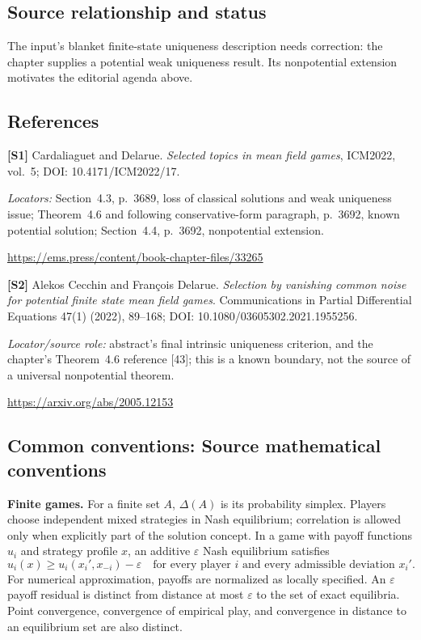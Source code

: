 \documentclass[11pt,a4paper]{article}
\begin{document}
\subsection*{Source relationship and status}
The input's blanket finite-state uniqueness description needs correction: the chapter supplies a potential weak uniqueness result. Its nonpotential extension motivates the editorial agenda above.
\subsection*{References}
\begingroup\footnotesize\raggedright
{\footnotesize\raggedright
\textbf{[S1]} Cardaliaguet and Delarue. \emph{Selected topics in mean field games}, ICM2022, vol.~5; DOI: 10.4171/ICM2022/17.\par
\textit{Locators:} Section~4.3, p.~3689, loss of classical solutions and weak uniqueness issue; Theorem~4.6 and following conservative-form paragraph, p.~3692, known potential solution; Section~4.4, p.~3692, nonpotential extension.\par
\url{https://ems.press/content/book-chapter-files/33265}\par\smallskip
\textbf{[S2]} Alekos Cecchin and Fran\c{c}ois Delarue. \emph{Selection by vanishing common noise for potential finite state mean field games}. Communications in Partial Differential Equations 47(1) (2022), 89--168; DOI: 10.1080/03605302.2021.1955256.\par
\textit{Locator/source role:} abstract's final intrinsic uniqueness criterion, and the chapter's Theorem~4.6 reference [43]; this is a known boundary, not the source of a universal nonpotential theorem.\par
\url{https://arxiv.org/abs/2005.12153}\par}
\par\endgroup

\subsection*{Common conventions: Source mathematical conventions}

\textbf{Finite games.} For a finite set $A$, $\Delta(A)$ is its probability
simplex. Players choose independent mixed strategies in Nash equilibrium;
correlation is allowed only when explicitly part of the solution concept.
In a game with payoff functions $u_i$ and strategy profile $x$, an additive
$\varepsilon$ Nash equilibrium satisfies
\[
 u_i(x)\geq u_i(x_i',x_{-i})-\varepsilon
 \quad\text{for every player $i$ and every admissible deviation $x_i'$}.
\]
For numerical approximation, payoffs are normalized as locally specified.
An $\varepsilon$ payoff residual is distinct from distance at most
$\varepsilon$ to the set of exact equilibria. Point convergence, convergence
of empirical play, and convergence in distance to an equilibrium set are
also distinct.
\end{document}
